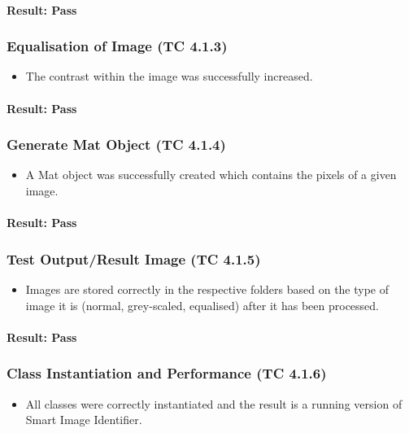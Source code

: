 \documentclass[a4paper,12pt]{report}
\begin{document}
		\paragraph{Result: Pass}
		
		\subsubsection{Equalisation of Image (TC 4.1.3)}
		\begin {itemize}
			\item The contrast within the image was successfully increased.
		\end {itemize}	
		\paragraph{Result: Pass}
		
		\subsubsection{Generate Mat Object (TC 4.1.4)}
		\begin {itemize}
			\item A Mat object was successfully created which contains the pixels of a given image.
		\end {itemize}
		\paragraph{Result: Pass}
		
		\subsubsection{Test Output/Result Image (TC 4.1.5)}
		\begin {itemize}
		\item Images are stored correctly in the respective folders based on the type of image it is (normal, grey-scaled, equalised) after it has been processed.
		\end {itemize}
		\paragraph{Result: Pass}
		
		\subsubsection{Class Instantiation and Performance (TC 4.1.6)}
		\begin {itemize}
		\item All classes were correctly instantiated and the result is a running version of Smart Image Identifier.
		\end {itemize}
\end{document}
